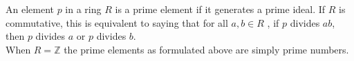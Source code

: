 \documentclass[12pt]{article}
\begin{document}
An element $p$ in a ring $R$ is a prime element if it generates a prime ideal. If $R$ is commutative, this is equivalent to saying that for all $a,b \in R$ , if $p$ divides $ab$, then $p$ divides $a$ or $p$ divides $b$. \\

When $R = \mathbb{Z}$ the prime elements as formulated above are simply prime numbers.
\end{document}
